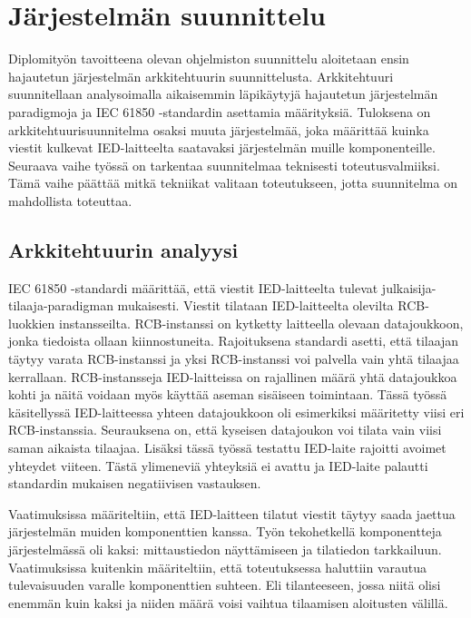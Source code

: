 \chapter{Järjestelmän suunnittelu}
Diplomityön tavoitteena olevan ohjelmiston suunnittelu aloitetaan ensin hajautetun järjestelmän arkkitehtuurin suunnittelusta. Arkkitehtuuri suunnitellaan analysoimalla aikaisemmin läpikäytyjä hajautetun järjestelmän paradigmoja ja IEC 61850 -standardin asettamia määrityksiä. Tuloksena on arkkitehtuurisuunnitelma osaksi muuta järjestelmää, joka määrittää kuinka viestit kulkevat IED-laitteelta saatavaksi järjestelmän muille komponenteille. Seuraava vaihe työssä on tarkentaa suunnitelmaa teknisesti toteutusvalmiiksi. Tämä vaihe päättää mitkä tekniikat valitaan toteutukseen, jotta suunnitelma on mahdollista toteuttaa.


\section{Arkkitehtuurin analyysi}
\label{ch:architecture-analysis}
IEC 61850 -standardi määrittää, että viestit IED-laitteelta tulevat julkaisija-tilaaja-pa\-ra\-dig\-man mukaisesti. Viestit tilataan IED-laitteelta olevilta RCB-luokkien instansseilta. RCB-instanssi on kytketty laitteella olevaan datajoukkoon, jonka tiedoista ollaan kiinnostuneita. Rajoituksena standardi asetti, että tilaajan täytyy varata RCB-instanssi ja yksi RCB-instanssi voi palvella vain yhtä tilaajaa kerrallaan. RCB-instansseja IED-laitteissa on rajallinen määrä yhtä datajoukkoa kohti ja näitä voidaan myös käyttää aseman sisäiseen toimintaan. Tässä työssä käsitellyssä IED-laitteessa yhteen datajoukkoon oli esimerkiksi määritetty viisi eri RCB-instanssia. Seurauksena on, että kyseisen datajoukon voi tilata vain viisi saman aikaista tilaajaa. Lisäksi tässä työssä testattu IED-laite rajoitti avoimet yhteydet viiteen. Tästä ylimeneviä yhteyksiä ei avattu ja IED-laite palautti standardin mukaisen negatiivisen vastauksen.

Vaatimuksissa määriteltiin, että IED-laitteen tilatut viestit täytyy saada jaettua järjestelmän muiden komponenttien kanssa. Työn tekohetkellä komponentteja järjestelmässä oli kaksi: mittaustiedon näyttämiseen ja tilatiedon tarkkailuun. Vaatimuksissa kuitenkin määriteltiin, että toteutuksessa haluttiin varautua tulevaisuuden varalle komponenttien suhteen. Eli tilanteeseen, jossa niitä olisi enemmän kuin kaksi ja niiden määrä voisi vaihtua tilaamisen aloitusten välillä.

